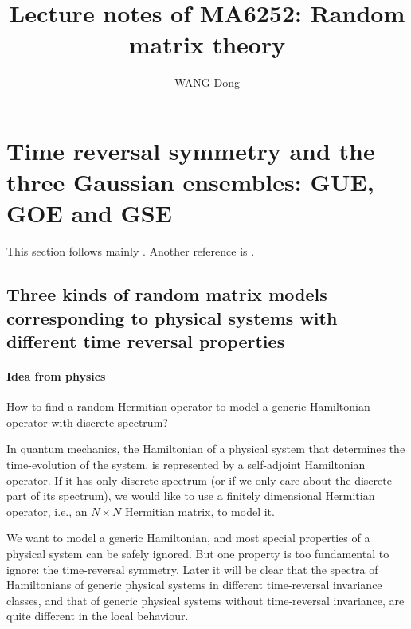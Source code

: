 \documentclass[11pt, a4paper]{article}
\title{Lecture notes of MA6252: Random matrix theory}
\author{WANG Dong}
\numberwithin{equation}{section}
\newcommand{\ie}{i.e.}
\theoremstyle{definition}
\theoremstyle{remark}
\begin{document}
\maketitle

\section{Time reversal symmetry and the three Gaussian ensembles: GUE, GOE and GSE} \label{sec:three_Gaussian_ensembles}

This section follows mainly \cite[Chapter 2]{Mehta04}. Another reference is \cite[Chapter 1]{Forrester10}.

\subsection{Three kinds of random matrix models corresponding to physical systems with different time reversal properties}

\paragraph{Idea from physics}

How to find a random Hermitian operator to model a generic Hamiltonian operator with discrete spectrum?

In quantum mechanics, the Hamiltonian of a physical system that determines the time-evolution of the system, is represented by a self-adjoint Hamiltonian operator. If it has only discrete spectrum (or if we only care about the discrete part of its spectrum), we would like to use a finitely dimensional Hermitian operator, \ie, an $N \times N$ Hermitian matrix, to model it.

We want to model a generic Hamiltonian, and most special properties of a physical system can be safely ignored. But one property is too fundamental to ignore: the time-reversal symmetry. Later it will be clear that the spectra of Hamiltonians of generic physical systems in different time-reversal invariance classes, and that of generic physical systems without time-reversal invariance, are quite different in the local behaviour.
\end{document}
